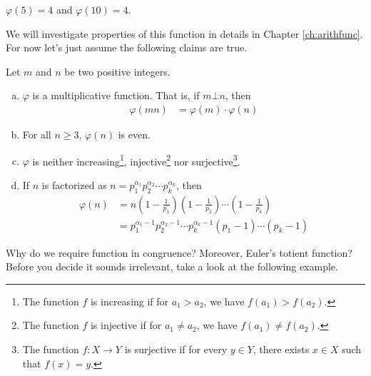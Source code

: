 \documentclass{subfile}
\begin{document}
		\begin{example}
			$\varphi(5)=4$ and $\varphi(10)=4$.
		\end{example}
	We will investigate properties of this function in details in Chapter \ref{ch:arithfunc}. For now let's just assume the following claims are true.
	\begin{proposition}\label{prop:phiproperties}
		Let $m$ and $n$ be two positive integers.
		\begin{enumerate}[(a)]
			\item $\varphi$ is a multiplicative function. That is, if $m \bot n$, then
			\begin{align*}
				\varphi(mn)
					& =\varphi(m) \cdot \varphi (n)
			\end{align*}
			\item For all $n \geq 3$, $\varphi(n)$ is even.
			\item $\varphi$ is neither increasing\footnote{The function $f$ is increasing if for $a_1 >a_2$, we have  $f(a_1) > f(a_2)$.}, injective\footnote{The function $f$ is injective if for $a_1 \neq a_2$, we have $f(a_1) \neq f(a_2)$.} nor surjective\footnote{The function $f:X \to Y$ is surjective if for every $y \in Y$, there exists $x \in X$ such that $f(x)=y$.}.
			\item If $n$ is factorized as $n= p_1^{\alpha_1} p_2^{\alpha_2} \cdots p_k^{\alpha_k}$, then
				\begin{align*}
					\varphi(n)
						& = n \left( 1 - \frac{1}{p_1} \right)  \left( 1 - \frac{1}{p_2} \right)  \cdots \left( 1 - \frac{1}{p_k} \right)\\
						& = p_1^{\alpha_1-1} p_2^{\alpha_2-1} \cdots p_k^{\alpha_k-1} \left( p_1 -1 \right) \cdots \left( p_k -1 \right)
				\end{align*}
		\end{enumerate}
	\end{proposition}


	Why do we require function in congruence? Moreover, Euler's totient function? Before you decide it sounds irrelevant, take a look at the following example.
\end{document}
